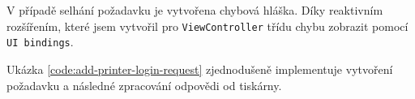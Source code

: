 V případě selhání požadavku je vytvořena chybová hláška.
Díky reaktivním rozšířením, které jsem vytvořil pro \texttt{ViewController} třídu chybu zobrazit pomocí \texttt{UI bindings}.

Ukázka \ref{code:add-printer-login-request} zjednodušeně implementuje vytvoření požadavku a následné zpracování odpovědi od tiskárny.


